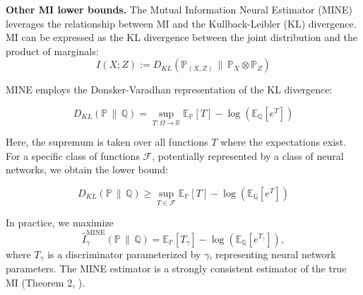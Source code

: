 \documentclass{article}
\theoremstyle{plain}
\theoremstyle{definition}
\theoremstyle{remark}
\begin{document}



\textbf{Other MI lower bounds.} The Mutual Information Neural Estimator (MINE) \cite{belghazi2018mutual} leverages the relationship between MI and the Kullback-Leibler (KL) divergence. MI can be expressed as the KL divergence between the joint distribution and the product of marginals:
\[
I(X; Z) := D_{KL}(\mathbb{P}_{(X,Z)} \,\|\, \mathbb{P}_X \otimes \mathbb{P}_Z)
\]

MINE employs the Donsker-Varadhan representation \cite{donsker1983asymptotic} of the KL divergence:

\begin{equation}
D_{KL}(\mathbb{P} \,\|\, \mathbb{Q}) = \sup_{T: \Omega \rightarrow \mathbb{R}} \mathbb{E}_{\mathbb{P}}[T] - \log\left(\mathbb{E}_{\mathbb{Q}}[e^T]\right)
\label{eq: kl_divergence}
\end{equation}

Here, the supremum is taken over all functions \( T \) where the expectations exist. For a specific class of functions \( \mathcal{F} \), potentially represented by a class of neural networks, we obtain the lower bound:

\begin{equation}
D_{KL}(\mathbb{P} \,\|\, \mathbb{Q}) \geq \sup_{T \in \mathcal{F}} \mathbb{E}_{\mathbb{P}}[T] - \log\left(\mathbb{E}_{\mathbb{Q}}[e^T]\right)
\label{eq: kl_divergence_inequality}
\end{equation}

In practice, we maximize
\[
\hat{I}^{\text{MINE}}_{\gamma}(\mathbb{P} \,\|\, \mathbb{Q}) = \mathbb{E}_{\mathbb{P}}[T_{\gamma}] - \log\left(\mathbb{E}_{\mathbb{Q}}[e^{T_{\gamma}}]\right),
\]
where \( T_{\gamma} \) is a discriminator parameterized by \( \gamma \), representing neural network parameters. The MINE estimator is a strongly consistent estimator of the true MI (Theorem 2, \cite{belghazi2018mutual}).
\end{document}

